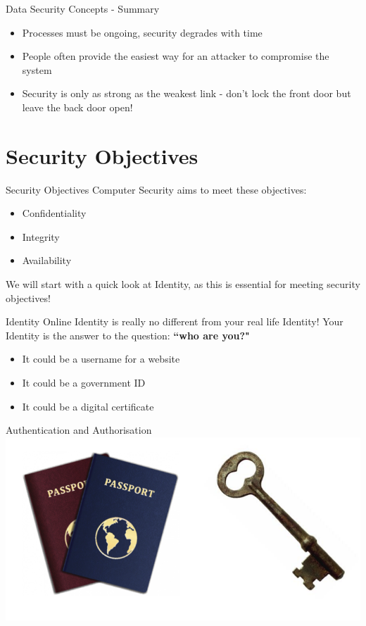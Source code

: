 \documentclass{beamer}
\begin{document}
\begin{frame}{Data Security Concepts - Summary}
\begin{itemize}
\item Processes must be ongoing, security degrades with time
\item People often provide the easiest way for an attacker to compromise the system 
\item Security is only as strong as the weakest link - don't lock the front door but leave the back door open!
\end{itemize}
\end{frame}

\section{Security Objectives}
\frame{\sectionpage}

\begin{frame}{Security Objectives}
Computer Security aims to meet these objectives: 
	\begin{itemize}
		\item Confidentiality
		\item Integrity
        \item Availability
	\end{itemize}
We will start with a quick look at Identity, as this is essential for meeting security objectives!
\end{frame}

\begin{frame}{Identity}
Online Identity is really no different from your real life Identity! 
Your Identity is the answer to the question: \textbf{``who are you?"}
\begin{itemize}
\item It could be a username for a website
\item It could be a government ID
\item It could be a digital certificate
\end{itemize}
\end{frame}

\begin{frame}{Authentication and Authorisation}
\includegraphics[width=1\linewidth]{authn-authz.png}
\end{frame}
\end{document}
